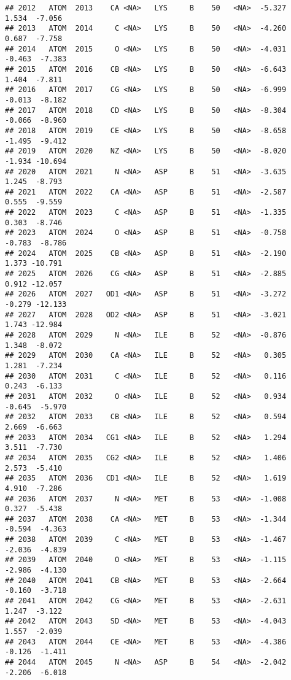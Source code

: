 \documentclass[
]{article}
\begin{document}
\begin{verbatim}
## 2012   ATOM  2013    CA <NA>   LYS     B    50   <NA>  -5.327   1.534  -7.056
## 2013   ATOM  2014     C <NA>   LYS     B    50   <NA>  -4.260   0.687  -7.758
## 2014   ATOM  2015     O <NA>   LYS     B    50   <NA>  -4.031  -0.463  -7.383
## 2015   ATOM  2016    CB <NA>   LYS     B    50   <NA>  -6.643   1.404  -7.811
## 2016   ATOM  2017    CG <NA>   LYS     B    50   <NA>  -6.999  -0.013  -8.182
## 2017   ATOM  2018    CD <NA>   LYS     B    50   <NA>  -8.304  -0.066  -8.960
## 2018   ATOM  2019    CE <NA>   LYS     B    50   <NA>  -8.658  -1.495  -9.412
## 2019   ATOM  2020    NZ <NA>   LYS     B    50   <NA>  -8.020  -1.934 -10.694
## 2020   ATOM  2021     N <NA>   ASP     B    51   <NA>  -3.635   1.245  -8.793
## 2021   ATOM  2022    CA <NA>   ASP     B    51   <NA>  -2.587   0.555  -9.559
## 2022   ATOM  2023     C <NA>   ASP     B    51   <NA>  -1.335   0.303  -8.746
## 2023   ATOM  2024     O <NA>   ASP     B    51   <NA>  -0.758  -0.783  -8.786
## 2024   ATOM  2025    CB <NA>   ASP     B    51   <NA>  -2.190   1.373 -10.791
## 2025   ATOM  2026    CG <NA>   ASP     B    51   <NA>  -2.885   0.912 -12.057
## 2026   ATOM  2027   OD1 <NA>   ASP     B    51   <NA>  -3.272  -0.279 -12.133
## 2027   ATOM  2028   OD2 <NA>   ASP     B    51   <NA>  -3.021   1.743 -12.984
## 2028   ATOM  2029     N <NA>   ILE     B    52   <NA>  -0.876   1.348  -8.072
## 2029   ATOM  2030    CA <NA>   ILE     B    52   <NA>   0.305   1.281  -7.234
## 2030   ATOM  2031     C <NA>   ILE     B    52   <NA>   0.116   0.243  -6.133
## 2031   ATOM  2032     O <NA>   ILE     B    52   <NA>   0.934  -0.645  -5.970
## 2032   ATOM  2033    CB <NA>   ILE     B    52   <NA>   0.594   2.669  -6.663
## 2033   ATOM  2034   CG1 <NA>   ILE     B    52   <NA>   1.294   3.511  -7.730
## 2034   ATOM  2035   CG2 <NA>   ILE     B    52   <NA>   1.406   2.573  -5.410
## 2035   ATOM  2036   CD1 <NA>   ILE     B    52   <NA>   1.619   4.910  -7.286
## 2036   ATOM  2037     N <NA>   MET     B    53   <NA>  -1.008   0.327  -5.438
## 2037   ATOM  2038    CA <NA>   MET     B    53   <NA>  -1.344  -0.594  -4.363
## 2038   ATOM  2039     C <NA>   MET     B    53   <NA>  -1.467  -2.036  -4.839
## 2039   ATOM  2040     O <NA>   MET     B    53   <NA>  -1.115  -2.986  -4.130
## 2040   ATOM  2041    CB <NA>   MET     B    53   <NA>  -2.664  -0.160  -3.718
## 2041   ATOM  2042    CG <NA>   MET     B    53   <NA>  -2.631   1.247  -3.122
## 2042   ATOM  2043    SD <NA>   MET     B    53   <NA>  -4.043   1.557  -2.039
## 2043   ATOM  2044    CE <NA>   MET     B    53   <NA>  -4.386  -0.126  -1.411
## 2044   ATOM  2045     N <NA>   ASP     B    54   <NA>  -2.042  -2.206  -6.018

\end{verbatim}
\end{document}
